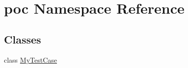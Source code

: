 \hypertarget{namespacepoc}{}\section{poc Namespace Reference}
\label{namespacepoc}
\subsection*{Classes}
\begin{DoxyCompactItemize}
\item 
class \hyperlink{classpoc_1_1MyTestCase}{My\+Test\+Case}
\end{DoxyCompactItemize}
